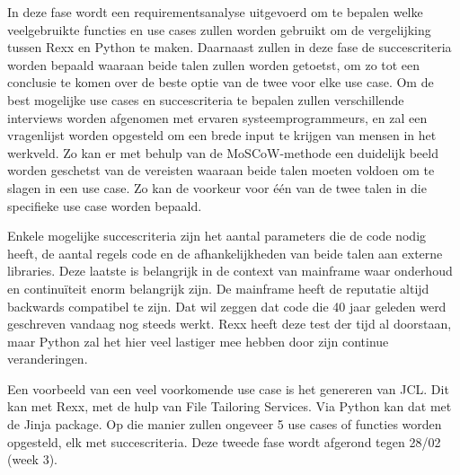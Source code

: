 In deze fase wordt een requirementsanalyse uitgevoerd om te bepalen welke veelgebruikte functies en use cases zullen worden gebruikt om de vergelijking tussen Rexx en Python te maken. Daarnaast zullen in deze fase de succescriteria worden bepaald waaraan beide talen zullen worden getoetst, om zo tot een conclusie te komen over de beste optie van de twee voor elke use case. Om de best mogelijke use cases en succescriteria te bepalen zullen verschillende interviews worden afgenomen met ervaren systeemprogrammeurs, en zal een vragenlijst worden opgesteld om een brede input te krijgen van mensen in het werkveld. Zo kan er met behulp van de MoSCoW-methode een duidelijk beeld worden geschetst van de vereisten waaraan beide talen moeten voldoen om te slagen in een use case. Zo kan de voorkeur voor één van de twee talen in die specifieke use case worden bepaald. 

Enkele mogelijke succescriteria zijn het aantal parameters die de code nodig heeft, de aantal regels code en de afhankelijkheden van beide talen aan externe libraries. Deze laatste is belangrijk in de context van mainframe waar onderhoud en continuïteit enorm belangrijk zijn. De mainframe heeft de reputatie altijd backwards compatibel te zijn. Dat wil zeggen dat code die 40 jaar geleden werd geschreven vandaag nog steeds werkt. Rexx heeft deze test der tijd al doorstaan, maar Python zal het hier veel lastiger mee hebben door zijn continue veranderingen.

Een voorbeeld van een veel voorkomende use case is het genereren van JCL. Dit kan met Rexx, met de hulp van File Tailoring Services. Via Python kan dat met de Jinja package. Op die manier zullen ongeveer 5 use cases of functies worden opgesteld, elk met succescriteria. Deze tweede fase wordt afgerond tegen 28/02 (week 3).

